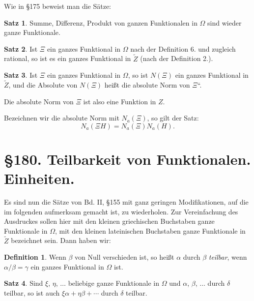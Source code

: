 \documentclass[12pt,a4paper]{article}
\theoremstyle{definition}
\newtheorem{defin}{Definition}[section]
\newtheorem{satz}{Satz}[section]
\begin{document}
Wie in \S 175 beweist man die Sätze:

\begin{satz}
Summe, Differenz, Produkt von ganzen Funktionalen in $\Omega$ sind wieder ganze Funktionale.
\end{satz}

\begin{satz}
Ist $\Xi$ ein ganzes Funktional in $\Omega$ nach der Definition 6. und zugleich rational, so ist es ein ganzes Funktional in $\tilde{Z}$ (nach der Definition 2.).
\end{satz}

\begin{satz}
Ist $\Xi$ ein ganzes Funktional in $\Omega$, so ist $N(\Xi)$ ein ganzes Funktional in $\tilde{Z}$, und die Absolute von $N(\Xi)$ heißt die \glqq absolute Norm von $\Xi$``.
\end{satz}

Die absolute Norm von $\Xi$ ist also eine Funktion in $Z$.

Bezeichnen wir die absolute Norm mit $N_a(\Xi)$, so gilt der Satz:
\begin{equation}
N_a(\Xi H) = N_a(\Xi) N_a(H).
\end{equation}

\newpage
\section*{\S 180. Teilbarkeit von Funktionalen. Einheiten.}

Es sind nun die Sätze von Bd. II, \S 155 mit ganz geringen Modifikationen, auf die im folgenden aufmerksam gemacht ist, zu wiederholen. Zur Vereinfachung des Ausdruckes sollen hier mit den kleinen griechischen Buchstaben ganze Funktionale in $\Omega$, mit den kleinen lateinischen Buchstaben ganze Funktionale in $\tilde{Z}$ bezeichnet sein. Dann haben wir:

\begin{defin}
Wenn $\beta$ von Null verschieden ist, so heißt $\alpha$ durch $\beta$ \emph{teilbar}, wenn $\alpha/\beta = \gamma$ ein ganzes Funktional in $\Omega$ ist.
\end{defin}

\begin{satz}
Sind $\xi$, $\eta$, $\ldots$ beliebige ganze Funktionale in $\Omega$ und $\alpha$, $\beta$, $\ldots$ durch $\delta$ teilbar, so ist auch $\xi\alpha + \eta\beta + \cdots$ durch $\delta$ teilbar.
\end{satz}
\end{document}
